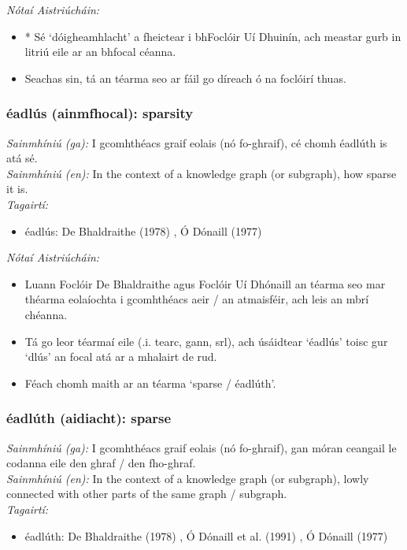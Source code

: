 \noindent \textit{Nótaí Aistriúcháin:}
\begin{itemize}
	\item * Sé `dóigheamhlacht' a fheictear i bhFoclóir Uí Dhuinín, ach meastar gurb in litriú eile ar an bhfocal céanna.
	\item Seachas sin, tá an téarma seo ar fáil go díreach ó na foclóirí thuas.
\end{itemize}


\subsubsection*{éadlús (ainmfhocal): sparsity}
 \noindent \textit{Sainmhíniú (ga):} I gcomhthéacs graif eolais (nó fo-ghraif), cé chomh éadlúth is atá sé.
\\
 \noindent \textit{Sainmhíniú (en):} In the context of a knowledge graph (or subgraph), how sparse it is.
\\
 \noindent \textit{Tagairtí:}
\begin{itemize}
	\item éadlús: De Bhaldraithe (1978) \cite{de-bhaldraithe}, Ó Dónaill (1977) \cite{odonaill}
\end{itemize}

 \noindent \textit{Nótaí Aistriúcháin:}
\begin{itemize}
	\item Luann Foclóir De Bhaldraithe agus Foclóir Uí Dhónaill an téarma seo  mar théarma eolaíochta i gcomhthéacs aeir / an atmaisféir, ach leis an mbrí chéanna.
	\item Tá go leor téarmaí eile (.i. tearc, gann, srl), ach úsáidtear `éadlús' toisc gur `dlús' an focal atá ar a mhalairt de rud.
	\item Féach chomh maith ar an téarma `sparse / éadlúth'.
\end{itemize}


\subsubsection*{éadlúth (aidiacht): sparse}
 \noindent \textit{Sainmhíniú (ga):} I gcomhthéacs graif eolais (nó fo-ghraif), gan móran ceangail le codanna eile den ghraf / den fho-ghraf.
\\
 \noindent \textit{Sainmhíniú (en):} In the context of a knowledge graph (or subgraph), lowly connected with other parts of the same graph / subgraph.
\\
 \noindent \textit{Tagairtí:}
\begin{itemize}
	\item éadlúth: De Bhaldraithe (1978) \cite{de-bhaldraithe}, Ó Dónaill et al. (1991) \cite{focloir-beag}, Ó Dónaill (1977) \cite{odonaill}
\end{itemize}

